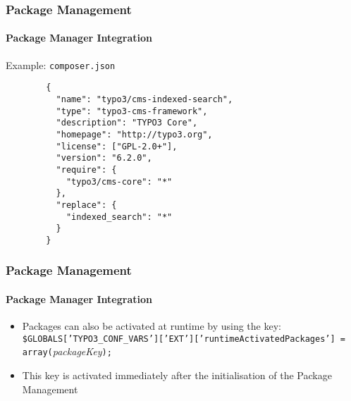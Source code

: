 
\begin{frame}[fragile]
	\frametitle{Package Management}
	\framesubtitle{Package Manager Integration}

	Example: \texttt{composer.json}

	\lstset{
		basicstyle=\tiny\ttfamily
	}

	\begin{lstlisting}
		{
		  "name": "typo3/cms-indexed-search",
		  "type": "typo3-cms-framework",
		  "description": "TYPO3 Core",
		  "homepage": "http://typo3.org",
		  "license": ["GPL-2.0+"],
		  "version": "6.2.0",
		  "require": {
		    "typo3/cms-core": "*"
		  },
		  "replace": {
		    "indexed_search": "*"
		  }
		}
	\end{lstlisting}

\end{frame}


\begin{frame}[fragile]
	\frametitle{Package Management}
	\framesubtitle{Package Manager Integration}

	\lstset{
		basicstyle=\smaller\ttfamily
	}

	\begin{itemize}
		\item Packages can also be activated at runtime by using the key:
			\smaller\texttt{\$GLOBALS['TYPO3\_CONF\_VARS']['EXT']['runtimeActivatedPackages'] = array(}\space\textit{packageKey}\space\texttt{);}\normalsize

		\item This key is activated immediately after the initialisation of the Package Management

	\end{itemize}

\end{frame}


